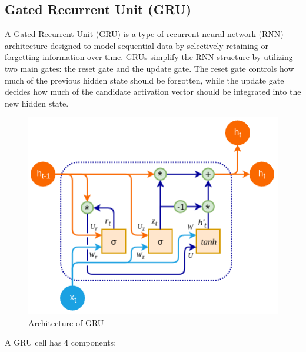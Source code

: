 \documentclass{ieeeojies}
\begin{document}
\subsection{Gated Recurrent Unit (GRU)}
A Gated Recurrent Unit \cite{b12} (GRU) is a type of recurrent neural network (RNN) architecture designed to model sequential data by selectively retaining or forgetting information over time. GRUs simplify the RNN structure by utilizing two main gates: the reset gate and the update gate. The reset gate controls how much of the previous hidden state should be forgotten, while the update gate decides how much of the candidate activation vector should be integrated into the new hidden state.
\begin{figure}[H]
	\centering
	\begin{minipage}{0.25\textwidth}
		\centering
		\includegraphics[width=1\textwidth]{bibliography/Images/GRU_Img1.png}
		\caption{Architecture of GRU}
		\label{fig:1}
	\end{minipage}
\end{figure}
A GRU cell has 4 components:
\end{document}

